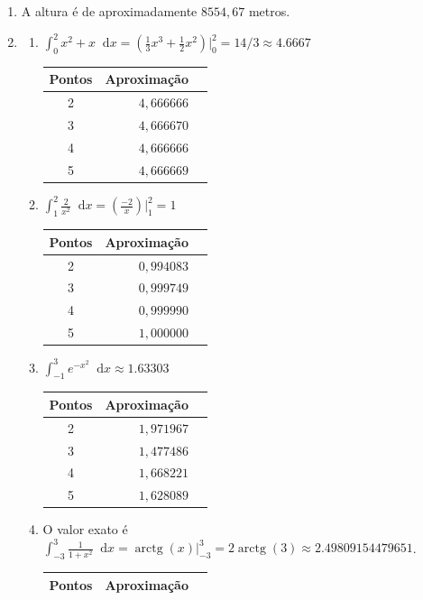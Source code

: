 \documentclass[12pt,a4paper]{article}
\newcommand*\arctg{\operatorname{arctg}}
\newcommand*\diff{\mathop{}\!\mathrm{d}}
\begin{document}
\begin{enumerate}
\begin{itemize}
\end{itemize}
\item A altura é de aproximadamente $8554,67$ metros.
\item
\begin{enumerate}
\item $\int_0^2 x^2 + x\diff{x} = \left( \frac{1}{3}x^3 +\frac{1}{2}x^2 \right)\Big|_0^2 = 14/3 \approx 4.6667$
\begin{center}
\begin{tabular}{crr}
\hline
Pontos & Aproximação \\ \hline
2      & $4,666666$ \\
3      & $4,666670$ \\
4      & $4,666666$ \\
5      & $4,666669$ \\
\hline
\end{tabular}
\end{center}
\item $\int_1^2 \frac{2}{x^2}\diff{x} = \left( \frac{-2}{x} \right)\Big|_1^2 = 1$
\begin{center}
\begin{tabular}{crr}
\hline
Pontos & Aproximação \\ \hline
2      & $0,994083$ \\
3      & $0,999749$ \\
4      & $0,999990$ \\
5      & $1,000000$ \\
\hline
\end{tabular}
\end{center}
\item $\int_{-1}^3 e^{-x^2}\diff{x} \approx 1.63303$
\begin{center}
\begin{tabular}{crr}
\hline
Pontos & Aproximação \\ \hline
2      & $1,971967$ \\
3      & $1,477486$ \\
4      & $1,668221$ \\
5      & $1,628089$ \\
\hline
\end{tabular}
\end{center}
\item O valor exato é $\int_{-3}^3 \frac{1}{1+x^2} \diff{x} = \arctg(x) \Big|_{-3}^3 = 2 \arctg(3) \approx 2.49809154479651$.
\begin{center}
\begin{tabular}{crr}
\hline
Pontos & Aproximação \\ \hline

\end{tabular}
\end{center}
\end{enumerate}
\end{enumerate}
\end{document}

